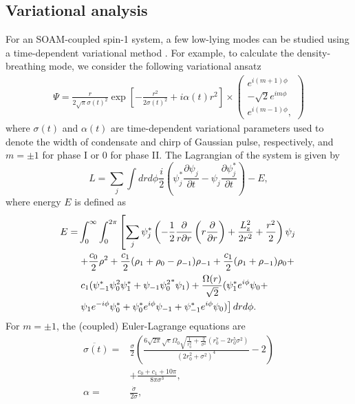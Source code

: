 \documentclass[pra,twocolumn,aps,superscriptaddress,showpacs,longbibliography]{revtex4-1}
\begin{document}
\subsection{Variational analysis}
For an SOAM-coupled spin-1 system, a few low-lying modes can be studied using a time-dependent variational method \cite{PhysRevLett.77.5320}. 
For example, to calculate the density-breathing mode, we consider the following variational ansatz
\begin{multline}\label{var_ansatz}
\Psi =\frac{r}{2\sqrt{\pi}\sigma(t)^2} \exp\left[-\frac{r^2}{2 \sigma (t)^2}+i \alpha(t) r^2\right]\times
\begin{pmatrix}
  e^{i (m+1) \phi} \\
  -\sqrt{2} e^{im \phi}\\
 e^{i (m-1) \phi},
\end{pmatrix}
\end{multline}
where $\sigma(t)$ and $\alpha(t)$ are time-dependent variational parameters used to denote the width of condensate and chirp of Gaussian pulse, respectively,  and $m=\pm1$ for phase I or $0$ for phase II. 
The Lagrangian of the system is given by
\begin{equation}
\label{lagran}
 L = \sum_{j} \int dr d\phi \frac{i}{2}\left( \psi_j^*\frac{\partial \psi_j}{\partial t} -\psi_j\frac{\partial \psi_j^*}{\partial t}\right) -E,
\end{equation}
where energy $E$ is defined as 
\begin{align}
E=&\int_0^{\infty}\int_0^{2\pi}\left[\sum_j\psi_j^*\left(-\frac{1}{2}\frac{\partial}{r \partial r}
 \left(r\frac{\partial}{\partial r}\right)+
\frac{L_{\rm z}^2}{2r^2}+
\frac{r^2}{2}\right)\psi_j \right. \nonumber\\& \left.
+\frac{c_0}{2}\rho^2 + \frac{c_1}{2}(\rho_1 +\rho_0-\rho_{-1})\rho_{-1}+ \frac{c_1}{2}(\rho_1 +\rho_{-1})\rho_{0} + \right. \nonumber\\& \left. c_1(\psi_{-1}^*\psi_0^2\psi_1^*+\psi_{-1}{\psi_0^2}^*\psi_1)
+\frac{\Omega(r)}{\sqrt{2}} (\psi_1^*e^{i\phi}\psi_0 +\right. \nonumber \\& \left. \psi_1 e^{-i\phi}\psi_0^* +\psi_0^*e^{i\phi}\psi_{-1}+
\psi_{-1}^*e^{i\phi}\psi_0 ) \right] dr d\phi.
\end{align}
For $ m = \pm1$, the (coupled) Euler-Lagrange equations are
\begin{subequations}\label{EL_eqs}
\begin{align}
\ddot{\sigma(t)} =&\frac{\sigma}{2}\left(\frac{6 \sqrt{2 \pi } \sqrt{e} \Omega_0  \sqrt{\frac{1}{r_0^2}+\frac{2}{\sigma^2}} \left(r_0^7-2 r_0^5 \sigma^2\right)}{\left(2r_0^2+\sigma^2\right)^4}-2\right) \nonumber\\& +\frac{c_0+c_1+10 \pi }{8 \pi  \sigma^3},\\
\alpha=&\frac{\dot{\sigma}}{2\sigma},
\end{align}
\end{subequations}
\end{document}
